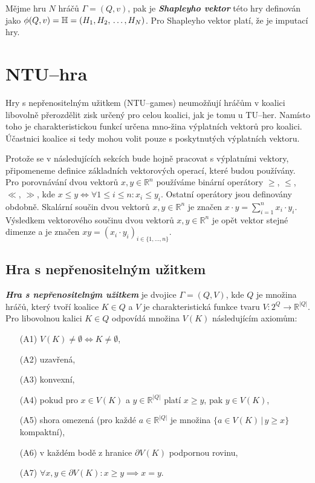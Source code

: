        Mějme hru $N$ hráčů $\Gamma = (Q, v)$, pak je \textit{\textbf{Shapleyho vektor}} této hry definován jako $\phi(Q, v) = \mathbb{H} = (H_1, H_2,\\ \dots, H_N)$. Pro Shapleyho vektor platí, že je imputací hry.

\section{NTU--hra}
    \label{sec:NTU}
    Hry s nepřenositelným užitkem \cite{Coop_intro,Game_Theory,EOLSS} (NTU--games) neumožňují hráčům v koalici libovolně přerozdělit zisk určený pro celou koalici, jak je tomu u TU--her. Namísto toho je charakteristickou funkcí určena mno-žina výplatních vektorů pro koalici. Účastnici koalice si tedy mohou volit pouze s poskytnutých výplatních vektoru.

    Protože se v následujících sekcích bude hojně pracovat s výplatními vektory, připomeneme definice základních vektorových operací, které budou používány. Pro porovnávání dvou vektorů $x, y \in \mathbb{R}^n$ používáme binární operátory $\geqslant$, $\leqslant$, $\ll$, $\gg$, kde $x \leqslant y \iff \forall 1 \leq i \leq n: x_i \leq y_i$. Ostatní operátory jsou definovány obdobně. Skalární součin dvou vektorů $x, y \in \mathbb{R}^n$ je značen $x \cdot y = \sum^n_{i = 1}x_i \cdot y_i$. Výsledkem vektorového součinu dvou vektorů $x, y \in \mathbb{R}^n$ je opět vektor stejné dimenze a je značen $xy = (x_i \cdot y_i)_{i \in \{1, \dots, n\}}$.

    \subsection{Hra s nepřenositelným užitkem}
        \textit{\textbf{Hra s nepřenositelným užitkem}} je dvojice $\Gamma = (Q, V)$, kde $Q$ je množina hráčů, který tvoří koalice $K \in Q$ a $V$ je charakteristická funkce tvaru $V: 2^Q \rightarrow \mathbb{R}^{|Q|}$. Pro libovolnou kalici $K \in Q$ odpovídá množina $V(K)$ následujícím axiomům:

        \begin{itemize}
            \item[(A1)] $V(K) \neq \emptyset \iff K \neq \emptyset$,
            \item[(A2)] uzavřená,
            \item[(A3)] konvexní,
            \item[(A4)] pokud pro $x \in V(K)$ a $y \in \mathbb{R}^{|Q|}$ platí $x \geqslant y$, pak $y \in V(K)$,
            \item[(A5)] shora omezená (pro každé $a \in \mathbb{R}^{|Q|}$ je množina $\{a \in V(K)\,|\, y \geqslant x\}$ kompaktní),
            \item[(A6)] v každém bodě z hranice $\partial V(K)$ podpornou rovinu,
            \item[(A7)] $\forall x, y \in \partial V(K): x \geqslant y \implies x = y$.
        \end{itemize}


